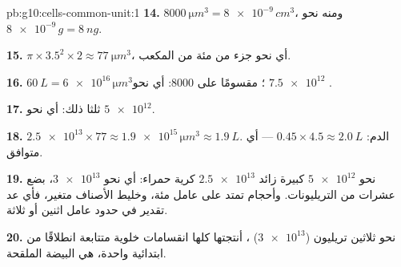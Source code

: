 \begin{solution}{pb:g10:cells-common-unit:1}
\textbf{14.} $\qty{8000}{\micro m^3} = \num{8e-9}\,\unit{cm^3}$، ومنه
نحو $\num{8e-9}\,\unit{g} = \qty{8}{ng}$.

\textbf{15.} $\pi \times 3.5^2 \times 2 \approx \qty{77}{\micro m^3}$،
أي نحو جزء من مئة من المكعب.

\textbf{16.} $\qty{60}{L} = \num{6e16}\,\unit{\micro m^3}$؛ مقسومًا
على 8000: أي نحو $\num{7.5e12}$ .

\textbf{17.} ثلثا ذلك: أي نحو $\num{5e12}$.

\textbf{18.} $\num{2.5e13} \times 77 \approx \num{1.9e15}\,\unit{\micro
m^3} \approx \qty{1.9}{L}$.  الدم: $0.45 \times 4.5 \approx
\qty{2.0}{L}$ --- أي متوافق.

\textbf{19.} نحو $\num{5e12}$  كبيرة زائد $\num{2.5e13}$ كرية
حمراء: أي نحو $\num{3e13}$، بضع عشرات من التريليونات. وأحجام 
تمتد على عامل مئة، وخليط الأصناف متغير، فأي عد تقدير في حدود عامل
اثنين أو ثلاثة.

\textbf{20.} نحو ثلاثين تريليون ($\num{3e13}$) ، أنتجتها كلها
انقسامات خلوية متتابعة انطلاقًا من  ابتدائية واحدة، هي البيضة
الملقحة.
\end{solution}
